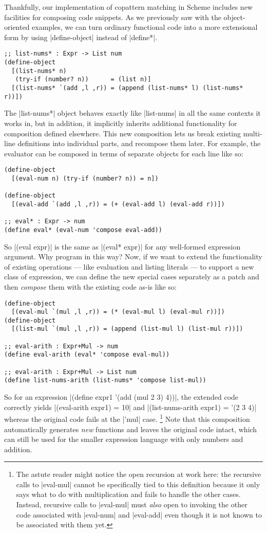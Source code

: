 Thankfully, our implementation of copattern matching in Scheme includes new facilities for composing code snippets.
As we previously saw with the object-oriented examples, we can turn ordinary functional code into a more extensional form by using \scm|define-object| instead of \scm|define*|.
\begin{verbatim}
;; list-nums* : Expr -> List num
(define-object
  [(list-nums* n)
   (try-if (number? n))      = (list n)]
  [(list-nums* `(add ,l ,r)) = (append (list-nums* l) (list-nums* r))])
\end{verbatim}
The \scm|list-nums*| object behaves exactly like \scm|list-nums| in all the same contexts it works in, but in addition, it implicitly inherits additional functionality for composition defined elsewhere.
This new composition lets us break existing multi-line definitions into individual parts, and recompose them later.
For example, the evaluator can be composed in terms of separate objects for each line like so:
\begin{verbatim}
(define-object
  [(eval-num n) (try-if (number? n)) = n])

(define-object
  [(eval-add `(add ,l ,r)) = (+ (eval-add l) (eval-add r))])

;; eval* : Expr -> num
(define eval* (eval-num 'compose eval-add))
\end{verbatim}
So \scm|(eval expr)| is the same as \scm|(eval* expr)| for any well-formed expression argument.
Why program in this way?
Now, if we want to extend the functionality of existing operations --- like evaluation and listing literals --- to support a new class of expression, we can define the new special cases separately as a patch and then \emph{compose} them with the existing code as-is like so:
\begin{verbatim}
(define-object
  [(eval-mul `(mul ,l ,r)) = (* (eval-mul l) (eval-mul r))])
(define-object
  [(list-mul `(mul ,l ,r)) = (append (list-mul l) (list-mul r))])

;; eval-arith : Expr+Mul -> num
(define eval-arith (eval* 'compose eval-mul))

;; eval-arith : Expr+Mul -> List num
(define list-nums-arith (list-nums* 'compose list-mul))
\end{verbatim}
So for an expression \scm|(define expr1 '(add (mul 2 3) 4))|, the extended code correctly yields \scm|(eval-arith expr1) = 10| and \scm|(list-nums-arith expr1) = '(2 3 4)| whereas the original code fails at the \scm|'mul| case.%
\footnote{
  The astute reader might notice the open recursion at work here: the recursive calls to \scm|eval-mul| cannot be specifically tied to this definition because it only says what to do with multiplication and fails to handle the other cases.
  Instead, recursive calls to \scm|eval-mul| must \emph{also} open to invoking the other code associated with \scm|eval-num| and \scm|eval-add| even though it is not known to be associated with them yet.}
%
Note that this composition automatically generates \emph{new} functions and leaves the original code intact, which can still be used for the smaller expression language with only numbers and addition.

